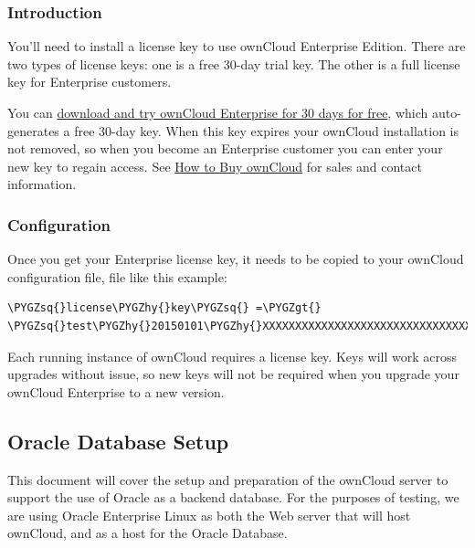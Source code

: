 \documentclass[letterpaper,10pt,english]{sphinxmanual}
\def\PYGZgt{\char`\>}
\def\PYGZhy{\char`\-}
\def\PYGZsq{\char`\'}
\renewcommand\PYGZsq{\textquotesingle}
\begin{document}
\subsubsection{Introduction}
\label{enterprise_installation/license_keys_installation:introduction}
You'll need to install a license key to use ownCloud Enterprise Edition. There
are two types of license keys: one is a free 30-day trial key. The other is a
full license key for Enterprise customers.

You can \href{https://owncloud.com/download/}{download and try ownCloud Enterprise for 30 days for free}, which auto-generates a free 30-day key. When
this key expires your ownCloud installation is not removed, so when you become
an Enterprise customer you can enter your new key to regain access. See \href{https://owncloud.com/how-to-buy-owncloud/}{How to
Buy ownCloud} for sales and
contact information.


\subsubsection{Configuration}
\label{enterprise_installation/license_keys_installation:configuration}
Once you get your Enterprise license key, it needs to be copied to your
ownCloud configuration file,
 file like this example:

\begin{Verbatim}[commandchars=\\\{\}]
\PYGZsq{}license\PYGZhy{}key\PYGZsq{} =\PYGZgt{} \PYGZsq{}test\PYGZhy{}20150101\PYGZhy{}XXXXXXXXXXXXXXXXXXXXXXXXXXXXXXXXXXXXXXXXXXX\PYGZhy{}YYYYYY’,
\end{Verbatim}

Each running instance of ownCloud requires a license key. Keys will work across
upgrades without issue, so new keys will not be required when you upgrade your
ownCloud Enterprise to a new version.


\subsection{Oracle Database Setup}
\label{enterprise_installation/oracle_db_configuration::doc}\label{enterprise_installation/oracle_db_configuration:oracle-database-setup}
This document will cover the setup and preparation of the ownCloud server to
support the use of Oracle as a backend database.  For the purposes of testing,
we are using Oracle Enterprise Linux as both the Web server that
will host ownCloud, and as a host for the Oracle Database.
\end{document}
